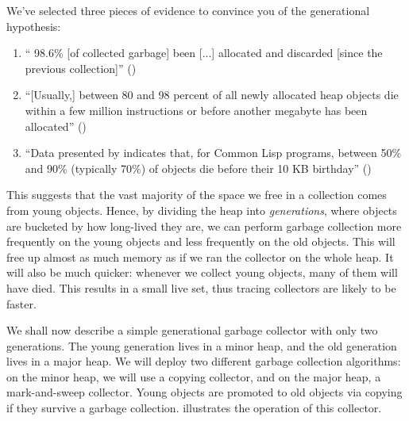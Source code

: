 We've selected three pieces of evidence to convince you of the generational hypothesis:
\begin{enumerate}
    \item `` 98.6\% [of collected garbage] been [...] allocated and discarded [since the previous collection]'' (\citet{foderaro-1981})
    \item ``[Usually,] between 80 and 98 percent of all newly allocated heap objects die within a few million instructions or before another megabyte has been allocated'' (\citet{wilson-1992})
    \item ``Data presented by \citet{zorn-1989} indicates that, for Common Lisp programs, between 50\% and 90\% (typically 70\%) of objects die before their 10 KB birthday'' (\citet{sansom-1993})
\end{enumerate}

This suggests that the vast majority of the space we free in a collection comes from young objects. Hence, by dividing the heap into \textit{generations}, where objects are bucketed by how long-lived they are, we can perform garbage collection more frequently on the young objects and less frequently on the old objects. This will free up almost as much memory as if we ran the collector on the whole heap. It will also be much quicker: whenever we collect young objects, many of them will have died. This results in a small live set, thus tracing collectors are likely to be faster. 

We shall now describe a simple generational garbage collector with only two generations.  The young generation lives in a minor heap, and the old generation lives in a major heap. We will deploy two different garbage collection algorithms: on the minor heap, we will use a copying collector, and on the major heap, a mark-and-sweep collector. Young objects are promoted to old objects via copying if they survive a garbage collection.  illustrates the operation of this collector.

